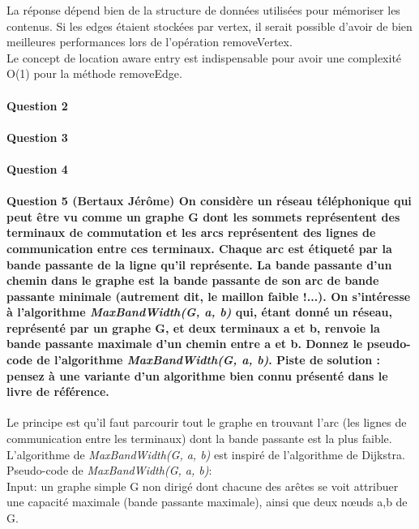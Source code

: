 \documentclass[a4paper]{article}
\begin{document}
La réponse dépend bien de la structure de données utilisées pour mémoriser les contenus. Si les edges étaient stockées par vertex, il serait possible d'avoir de bien meilleures performances lors de l'opération removeVertex.\\

Le concept de location aware entry est indispensable pour avoir une complexité O(1) pour la méthode removeEdge.

\paragraph{Question 2}

\paragraph{Question 3}

\paragraph{Question 4}

\paragraph{Question 5 (Bertaux Jérôme) On considère un réseau téléphonique qui peut être vu comme un graphe G dont les sommets représentent des terminaux de commutation et les arcs représentent des lignes de communication entre ces terminaux. Chaque arc est étiqueté par la bande passante de la ligne qu’il représente. La bande passante d’un chemin dans le graphe est la bande passante de son arc de bande passante minimale (autrement dit, le maillon faible !...). On s'intéresse à l’algorithme \textit{MaxBandWidth(G, a, b)} qui, étant donné un réseau, représenté par un graphe G, et deux terminaux a et b, renvoie la bande passante maximale d’un chemin entre a et b. Donnez le pseudo- code de l’algorithme \textit{MaxBandWidth(G, a, b)}. Piste de solution : pensez à une variante d’un algorithme bien connu présenté dans le livre de référence.}

Le principe est qu'il faut parcourir tout le graphe en trouvant l'arc (les lignes de communication entre les terminaux) dont la bande passante est la plus faible. L'algorithme de \textit{MaxBandWidth(G, a, b)} est inspiré de l'algorithme de Dijkstra.\\

Pseudo-code de \textit{MaxBandWidth(G, a, b)}:\\
     Input: un graphe simple G non dirigé dont chacune des arêtes se voit attribuer une capacité maximale (bande passante maximale), ainsi que deux nœuds a,b de G.
	 
\end{document}
